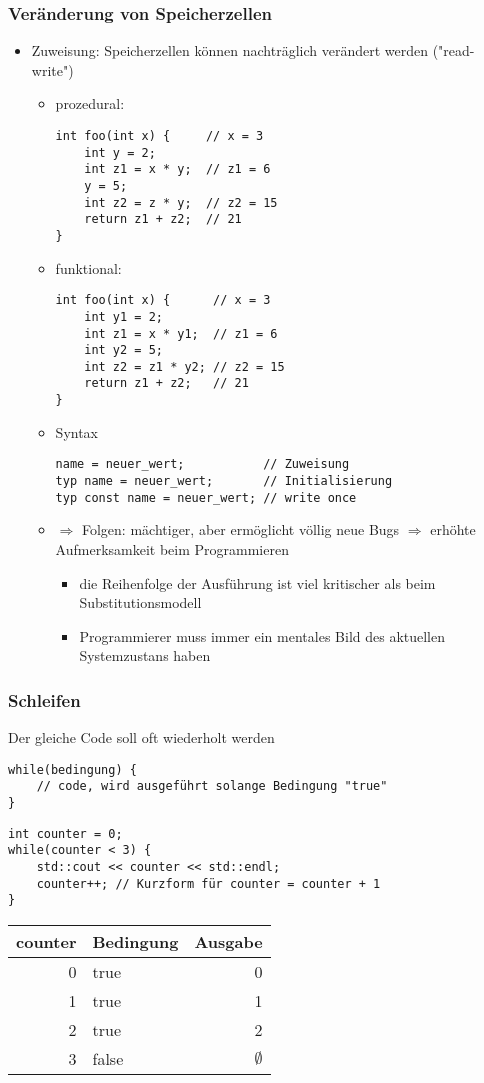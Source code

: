 \documentclass[a4paper]{scrartcl}
\begin{document}
\subsubsection{Veränderung von Speicherzellen}
\label{sec-9-2-3}
\begin{itemize}
\item Zuweisung: Speicherzellen können nachträglich verändert werden ("read-write")
\begin{itemize}
\item prozedural:
\begin{verbatim}
int foo(int x) {     // x = 3
	int y = 2;
	int z1 = x * y;  // z1 = 6
	y = 5;
	int z2 = z * y;  // z2 = 15
	return z1 + z2;  // 21
}
\end{verbatim}
\item funktional:
\begin{verbatim}
int foo(int x) {      // x = 3
	int y1 = 2;
	int z1 = x * y1;  // z1 = 6
	int y2 = 5;
	int z2 = z1 * y2; // z2 = 15
	return z1 + z2;   // 21
}
\end{verbatim}
\item Syntax
\begin{verbatim}
name = neuer_wert;           // Zuweisung
typ name = neuer_wert;       // Initialisierung
typ const name = neuer_wert; // write once
\end{verbatim}
\item $\Rightarrow$ Folgen: mächtiger, aber ermöglicht völlig neue Bugs $\Rightarrow$ erhöhte Aufmerksamkeit beim Programmieren
\begin{itemize}
\item die Reihenfolge der Ausführung ist viel kritischer als beim Substitutionsmodell
\item Programmierer muss immer ein mentales Bild des aktuellen Systemzustans haben
\end{itemize}
\end{itemize}
\end{itemize}
\subsubsection{Schleifen}
\label{sec-9-2-4}
Der gleiche Code soll oft wiederholt werden
\begin{verbatim}
while(bedingung) {
	// code, wird ausgeführt solange Bedingung "true"
}
\end{verbatim}
\begin{verbatim}
int counter = 0;
while(counter < 3) {
	std::cout << counter << std::endl;
	counter++; // Kurzform für counter = counter + 1
}
\end{verbatim}
\begin{center}
\begin{tabular}{rlr}
counter & Bedingung & Ausgabe\\
\hline
0 & true & 0\\
1 & true & 1\\
2 & true & 2\\
3 & false & $\emptyset$\\
\end{tabular}
\end{center}
\end{document}
